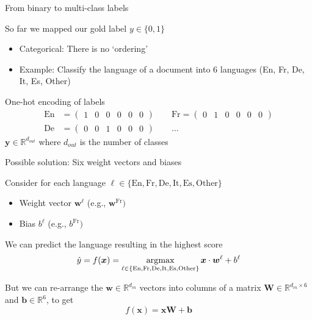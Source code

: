 \documentclass[12pt,aspectratio=169,handout]{beamer}
\begin{document}
\begin{frame}{From binary to multi-class labels}
	
	So far we mapped our gold label $y \in \{0, 1\}$
	
	\begin{itemize}
		\item Categorical: There is no `ordering'
		\item Example: Classify the language of a document into 6 languages (En, Fr, De, It, Es, Other)
	\end{itemize}
	
	\pause
	\begin{block}{One-hot encoding of labels}
		$$
		\begin{aligned}
			\text{En} &= \begin{pmatrix}1 & 0 & 0 & 0 & 0 & 0\end{pmatrix} \qquad
			\text{Fr} = \begin{pmatrix}0 & 1 & 0 & 0 & 0 & 0\end{pmatrix} \\
			\text{De} &= \begin{pmatrix}0 & 0 & 1 & 0 & 0 & 0\end{pmatrix} \qquad \ldots
		\end{aligned}
		$$
	$\bm{y} \in \mathbb{R}^{d_{out}}$ where $d_{out}$ is the number of classes
	\end{block}
	
\end{frame}

\begin{frame}{Possible solution: Six weight vectors and biases}
	
	Consider for each language $\ell \in \{\text{En}, \text{Fr}, \text{De}, \text{It}, \text{Es}, \text{Other}\}$
	\begin{itemize}
		\item Weight vector $\bm{w}^{\ell}$ (e.g., $\bm{w}^{\text{Fr}})$
		\item Bias $b^{\ell}$ (e.g., $b^{\text{Fr}})$
	\end{itemize}
	\pause We can predict the language resulting in the highest score
	$$
	\hat{y} = f(\bm{x}) = \operatorname*{arg\!\max}_{
		\ell \in \{\text{En}, \text{Fr}, \text{De}, \text{It}, \text{Es}, \text{Other}\}
	}
	\bm{x} \cdot \bm{w}^{\ell} + b^{\ell}
	$$
	
	\pause
	But we can re-arrange the $\bm{w} \in \mathbb{R}^{d_{in}}$ vectors into columns of a matrix $\bm{W} \in \mathbb{R}^{d_{in} \times 6}$ and $\bm{b} \in \mathbb{R}^6$, to get
	$$f(\bm{x}) = \bm{x} \bm{W} + \bm{b}$$
	
\end{frame}
\end{document}

